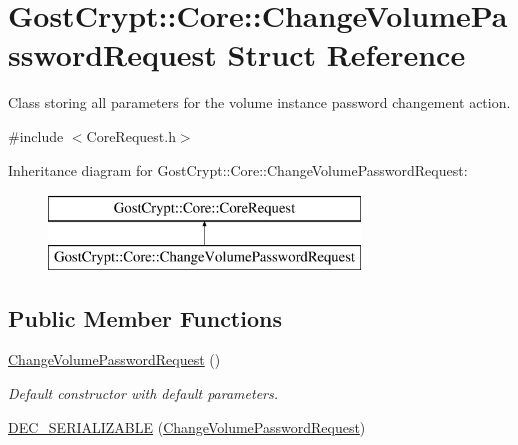 \hypertarget{struct_gost_crypt_1_1_core_1_1_change_volume_password_request}{}\section{Gost\+Crypt\+:\+:Core\+:\+:Change\+Volume\+Password\+Request Struct Reference}
\label{struct_gost_crypt_1_1_core_1_1_change_volume_password_request}


Class storing all parameters for the volume instance password changement action.  




{\ttfamily \#include $<$Core\+Request.\+h$>$}

Inheritance diagram for Gost\+Crypt\+:\+:Core\+:\+:Change\+Volume\+Password\+Request\+:\begin{figure}[H]
\begin{center}
\leavevmode
\includegraphics[height=2.000000cm]{struct_gost_crypt_1_1_core_1_1_change_volume_password_request}
\end{center}
\end{figure}
\subsection*{Public Member Functions}
\begin{DoxyCompactItemize}
\item 
\hyperlink{struct_gost_crypt_1_1_core_1_1_change_volume_password_request_a989715188b3ea4bc24bd1249f8dca2c1}{Change\+Volume\+Password\+Request} ()
\begin{DoxyCompactList}\small\item\em Default constructor with default parameters. \end{DoxyCompactList}\item 
\hyperlink{struct_gost_crypt_1_1_core_1_1_change_volume_password_request_aa0c1bf01f346c71f1e0bb342f69a540c}{D\+E\+C\+\_\+\+S\+E\+R\+I\+A\+L\+I\+Z\+A\+B\+LE} (\hyperlink{struct_gost_crypt_1_1_core_1_1_change_volume_password_request}{Change\+Volume\+Password\+Request})
\end{DoxyCompactItemize}
